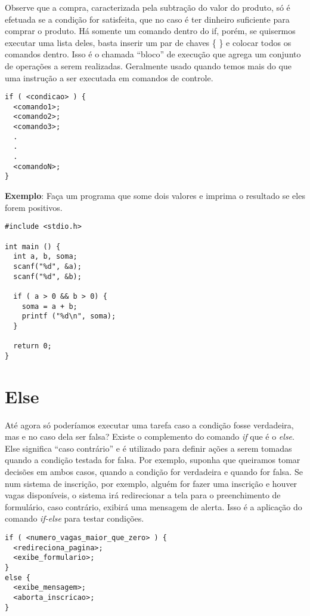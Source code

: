 \documentclass[12pt,a4paper]{book}
\begin{document}
Observe que a compra, caracterizada pela subtração do valor do produto, só é efetuada se a condição for satisfeita, que no caso é ter dinheiro suficiente para comprar o produto.
Há somente um comando dentro do if, porém, se quisermos executar uma lista deles, basta inserir um par de chaves \{ \} e colocar todos os comandos dentro. Isso é o chamada ``bloco'' de execução que agrega um conjunto de operações a serem realizadas. Geralmente usado quando temos mais do que uma instrução a ser executada em comandos de controle.

\begin{lstlisting}[label=comandoIf,caption=Exemplo múltiplos comandos]
if ( <condicao> ) {
  <comando1>;
  <comando2>;
  <comando3>;
  .
  .
  .
  <comandoN>;
}
\end{lstlisting}

\textbf{Exemplo}:
  Faça um programa que some dois valores e imprima o resultado se eles forem positivos.

\begin{lstlisting}[label=comandoIf,caption=Exemplo múltiplos comandos]
#include <stdio.h>

int main () {
  int a, b, soma;
  scanf("%d", &a);  
  scanf("%d", &b);
  
  if ( a > 0 && b > 0) {
    soma = a + b;
    printf ("%d\n", soma);
  }
  
  return 0;
}
\end{lstlisting}

\section{Else}
Até agora só poderíamos executar uma tarefa caso a condição fosse verdadeira, mas e no caso dela ser falsa? Existe o complemento do comando \textit{if} que é o \textit{else}. Else significa ``caso contrário'' e é utilizado para definir ações a serem tomadas quando a condição testada for falsa.
Por exemplo, suponha que queiramos tomar decisões em ambos casos, quando a condição for verdadeira e quando for falsa. Se num sistema de inscrição, por exemplo, alguém for fazer uma inscrição e houver vagas disponíveis, o sistema irá redirecionar a tela para o preenchimento de formulário, caso contrário, exibirá uma mensagem de alerta. Isso é a aplicação do comando \textit{if-else} para testar condições.

\begin{lstlisting}[label=comandoIf,caption=Exemplo com else]
if ( <numero_vagas_maior_que_zero> ) {
  <redireciona_pagina>;
  <exibe_formulario>;
}
else {
  <exibe_mensagem>;
  <aborta_inscricao>;
}
\end{lstlisting}
\end{document}
